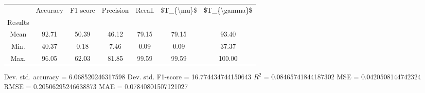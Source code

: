 \begin{tabular}{|c|c|c|c|c|c|c|}
\toprule
{} &  Accuracy &  F1 score &  Precision &  Recall &  \$T\_\{\textbackslash mu\}\$ &  \$T\_\{\textbackslash gamma\}\$ \\
Results &           &           &            &         &            &               \\
\hline
Mean    &     92.71 &     50.39 &      46.12 &   79.15 &      79.15 &         93.40 \\
Min.    &     40.37 &      0.18 &       7.46 &    0.09 &       0.09 &         37.37 \\
Max.    &     96.05 &     62.03 &      81.85 &   99.59 &      99.59 &        100.00 \\
\bottomrule
\end{tabular}

 Dev. std. accuracy = 6.068520246317598
 Dev. std. F1-score = 16.774434744150643
 $R^2$ = 0.08465741844187302
 MSE = 0.0420508144742324
 RMSE = 0.20506295246638873
 MAE = 0.07840801507121027